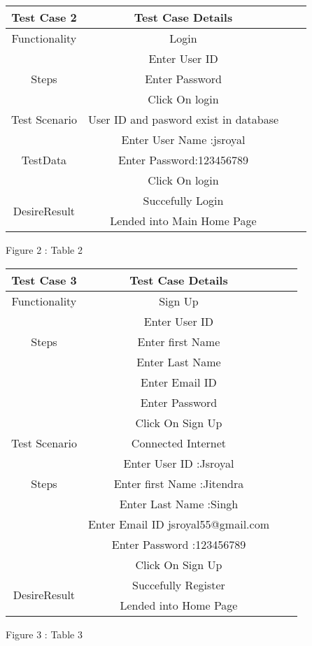 \documentclass[]{article}
\begin{document}
\begin{center}
\begin{tabular}{ |c|c|c|c|}
\hline
Test Case 2 & Test Case Details     \hspace{4cm} \\ 
\hline
 Functionality & Login \\ 
\hline
\multirow{3}{4em}{Steps} & Enter User ID  \\ 
& Enter Password \\ 
& Click On login \\ 
\hline
Test Scenario & User ID and pasword exist in database \\
\hline
\multirow{3}{4em}{TestData} & Enter User Name :jsroyal  \\ 
& Enter Password:123456789\\ 
& Click On login \\ 
\hline
\multirow{3}{4em}{DesireResult} & Succefully Login  \\ 
& Lended into Main Home Page\\  
\hline
\end{tabular}
\end{center}
\hspace{3.5cm} Figure 2 : Table 2



\begin{center}
\begin{tabular}{ |c|c|c|c| }
\hline
Test Case 3 & Test Case Details  \hspace{4cm} \\ 
\hline
 Functionality & Sign Up  \\ 
\hline
\multirow{3}{4em}{Steps} & Enter User ID  \\
& Enter first Name \\
& Enter Last Name \\ 
& Enter Email ID \\
& Enter Password \\
& Click On Sign Up \\ 
\hline
Test Scenario & Connected Internet \\
\hline
\multirow{3}{4em}{Steps} & Enter User ID :Jsroyal  \\
& Enter first Name :Jitendra\\
& Enter Last Name :Singh \\ 
& Enter Email ID  jsroyal55@gmail.com\\
& Enter Password :123456789\\
& Click On Sign Up \\ 
\hline
\multirow{3}{4em}{DesireResult} & Succefully Register   \\ 
& Lended into Home Page\\ 
\hline
\end{tabular}
\end{center}
\hspace{3.5cm} Figure 3 : Table 3
\end{document}
